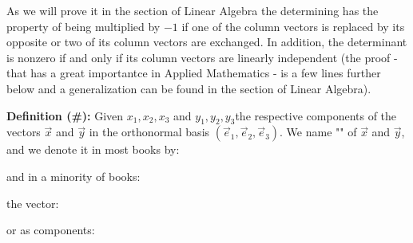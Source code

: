 	As we will prove it in the section of Linear Algebra the determining has the property of being multiplied by $-1$ if one of the column vectors is replaced by its opposite or two of its column vectors are exchanged. In addition, the determinant is nonzero if and only if its column vectors are linearly independent (the proof - that has a great importantce in Applied Mathematics - is a few lines further below and a generalization  can be found in the section of Linear Algebra).
	
	\textbf{Definition (\#\mydef):} Given $x_1,x_2,x_3$ and $y_1,y_2,y_3$the respective components of the vectors $\vec{x}$ and  $\vec{y}$ in the orthonormal basis $(\vec{e}_1,\vec{e}_2,\vec{e}_3)$. We name "" of $\vec{x}$ and $\vec{y}$, and we denote it in most books by:
	
	and in a minority of books:
	
	the vector:
	
	or as components\label{cross product matrix form}:
	

